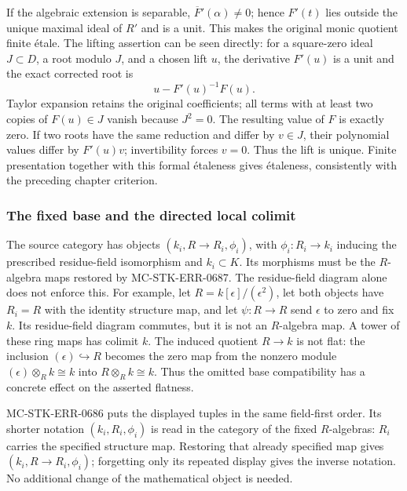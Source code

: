 If the algebraic extension is separable, \(\overline F'(\alpha)\ne0\); hence \(F'(t)\) lies outside the unique maximal ideal of \(R'\) and is a unit. This makes the original monic quotient finite étale. The lifting assertion can be seen directly: for a square-zero ideal \(J\subset D\), a root modulo \(J\), and a chosen lift \(u\), the derivative \(F'(u)\) is a unit and the exact corrected root is \[
 u-F'(u)^{-1}F(u).
\] Taylor expansion retains the original coefficients; all terms with at least two copies of \(F(u)\in J\) vanish because \(J^2=0\). The resulting value of \(F\) is exactly zero. If two roots have the same reduction and differ by \(v\in J\), their polynomial values differ by \(F'(u)v\); invertibility forces \(v=0\). Thus the lift is unique. Finite presentation together with this formal étaleness gives étaleness, consistently with the preceding chapter criterion.

\subsubsection{The fixed base and the directed local colimit}\label{algebra-proof-064-the-fixed-base-and-the-directed-local-colimit}

The source category has objects \((k_i,R\to R_i,\phi_i)\), with \(\phi_i:R_i\to k_i\) inducing the prescribed residue-field isomorphism and \(k_i\subset K\). Its morphisms must be the \(R\)-algebra maps restored by MC-STK-ERR-0687. The residue-field diagram alone does not enforce this. For example, let \(R=k[\epsilon]/(\epsilon^2)\), let both objects have \(R_i=R\) with the identity structure map, and let \(\psi:R\to R\) send \(\epsilon\) to zero and fix \(k\). Its residue-field diagram commutes, but it is not an \(R\)-algebra map. A tower of these ring maps has colimit \(k\). The induced quotient \(R\to k\) is not flat: the inclusion \((\epsilon)\hookrightarrow R\) becomes the zero map from the nonzero module \((\epsilon)\otimes_R k\cong k\) into \(R\otimes_R k\cong k\). Thus the omitted base compatibility has a concrete effect on the asserted flatness.

MC-STK-ERR-0686 puts the displayed tuples in the same field-first order. Its shorter notation \((k_i,R_i,\phi_i)\) is read in the category of the fixed \(R\)-algebras: \(R_i\) carries the specified structure map. Restoring that already specified map gives \((k_i,R\to R_i,\phi_i)\); forgetting only its repeated display gives the inverse notation. No additional change of the mathematical object is needed.

